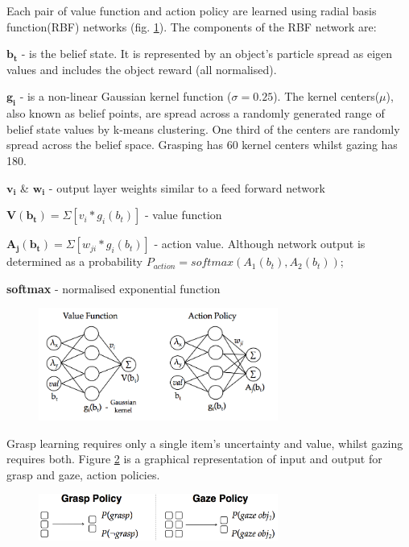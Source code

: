 \documentclass[11]{article}
\begin{document}
Each pair of value function and action policy are learned using radial basis function(RBF) networks (fig. \ref{fig:rbf}).
The components of the RBF network are:
\begin{list}{}{}
 \item $\pmb{b_t}$ - is the belief state. It is represented by an object's particle spread as eigen values and includes the object reward (all normalised).
 \item $\pmb{g_i}$ - is a non-linear Gaussian kernel function ($\sigma=0.25$).  The kernel centers($\mu$), also known as belief points, are spread across a randomly generated range of belief state values by k-means clustering. One third of the centers are randomly spread across the belief space.
Grasping has 60 kernel centers whilst gazing has 180.
 \item $\pmb{v_i}$ \& $\pmb{w_i}$ - output layer weights similar to a feed forward network
 \item $\pmb{V(b_t)}= \Sigma[v_i * g_i(b_t)]$ - value function
 \item $\pmb{A_j(b_t)}= \Sigma[w_{ji} * g_i(b_t)]$ - action value. Although network output is determined as a probability $P_{action} = softmax(A_1(b_t),A_2(b_t))$; 
 \item \textbf{softmax} - normalised exponential function
\end{list}

\begin{figure}[h]
	\centering
	\includegraphics[width=0.7\textwidth]{figures/rbf.png}
	\caption{}
	\label{fig:rbf}
\end{figure} 

Grasp learning requires only a single item's uncertainty and value, whilst gazing  requires both. 
Figure \ref{fig:inout} is a graphical representation of input and output for grasp and gaze, action policies.

\begin{figure}[h]
	\centering
	\includegraphics[width=0.7\textwidth]{figures/inputoutput.png}
	\caption{}
	\label{fig:inout}
\end{figure}
\end{document}
